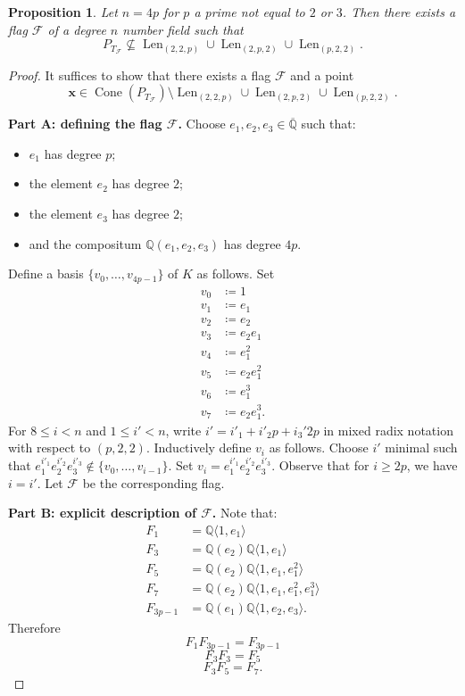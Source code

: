 \documentclass[letterpaper,10pt]{amsart}
\DeclareMathOperator{\Len}{Len}
\DeclareMathOperator{\Cone}{Cone}
\newcommand{\QQ}{\mathbb{Q}}      %
\newcommand{\la}{\langle}
\newcommand{\ra}{\rangle}
\newcommand{\cF}{\mathcal{F}}
\newtheorem{proposition}[theorem]{Proposition}
\theoremstyle{definition}
\theoremstyle{remark}
\begin{document}
\begin{proposition}
\label{lem:4p}
Let $n = 4p$ for $p$ a prime not equal to $2$ or $3$. Then there exists a flag $\cF$ of a degree $n$ number field such that 
\[
	P_{T_{\cF}} \not \subseteq \Len_{(2,2,p)} \cup \Len_{(2,p,2)} \cup \Len_{(p,2,2)}.
\]
\end{proposition}
\begin{proof}
It suffices to show that there exists a flag $\cF$ and a point 
\[
	\mathbf{x} \in \Cone(P_{T_{\cF}}) \setminus \Len_{(2,2,p)} \cup \Len_{(2,p,2)} \cup \Len_{(p,2,2)}.
\]

\noindent \textbf{Part A: defining the flag $\cF$.}
Choose $e_1,e_2,e_3 \in \overline{\QQ}$ such that:
\begin{itemize}
\item $e_1$ has degree $p$;
\item the element $e_2$ has degree $2$;
\item  the element $e_3$ has degree $2$;
\item and the compositum $\QQ(e_1,e_2,e_3)$ has degree $4p$. 
\end{itemize}
 
Define a basis $\{ v_0,\dots,v_{4p-1}\}$ of $K$ as follows. Set 
\begin{align*}
v_0 &\coloneqq 1 \\
v_1 &\coloneqq e_1 \\
v_2 &\coloneqq e_2 \\
v_3 &\coloneqq e_2 e_1 \\
v_4 &\coloneqq e_1^2 \\
v_5 &\coloneqq e_2 e_1^2 \\
v_6 &\coloneqq e_1^3 \\
v_7 &\coloneqq e_2e_1^3.
\end{align*}
For $8 \leq i < n$ and $1 \leq i' < n$, write $i' = i'_1 + i'_2p + i_3'2p$ in mixed radix notation with respect to $(p,2,2)$. Inductively define $v_i$ as follows. Choose $i'$ minimal such that $e_1^{i'_1}e_2^{i'_2}e_3^{i'_3} \notin \{v_0,\dots,v_{i-1}\}$. Set $v_i = e_1^{i'_1}e_2^{i'_2}e_3^{i'_3}$. Observe that for $i \geq 2p$, we have $i = i'$. Let $\cF$ be the corresponding flag.

\noindent \textbf{Part B: explicit description of $\cF$.}
Note that:
\begin{align*}
F_1 &= \QQ\la  1, e_1 \ra \\
F_3 &= \QQ( e_2) \QQ \la 1,e_1 \ra\\
F_5 &= \QQ( e_2)\QQ\la  1, e_1, e_1^2 \ra \\
F_7 &= \QQ( e_2)\QQ \la 1, e_1, e_1^2, e_1^3 \ra \\
F_{3p-1} &= \QQ( e_1 )  \QQ \la 1, e_2, e_3 \ra.
\end{align*}
Therefore
\[
	F_1F_{3p-1}  = F_{3p-1}
\]
\[
F_3F_3 = F_5
\]
\[
F_3F_5 = F_7.
\]


\end{proof}
\end{document}
